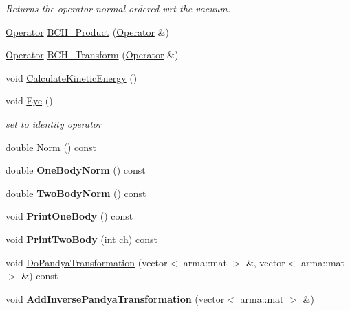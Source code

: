 \begin{DoxyCompactItemize}
\begin{DoxyCompactList}\small\item\em Returns the operator normal-\/ordered wrt the vacuum. \end{DoxyCompactList}\item 
\hyperlink{classOperator}{Operator} \hyperlink{classOperator_a6a91cd02db723ee28b7532e6af029033}{B\-C\-H\-\_\-\-Product} (\hyperlink{classOperator}{Operator} \&)
\item 
\hyperlink{classOperator}{Operator} \hyperlink{classOperator_adc5537604f6b71121163370aca79dfef}{B\-C\-H\-\_\-\-Transform} (\hyperlink{classOperator}{Operator} \&)
\item 
void \hyperlink{classOperator_a701c64f8be794e89fd28a643b56d534a}{Calculate\-Kinetic\-Energy} ()
\item 
\hypertarget{classOperator_a03a378f0da2fe71d8160bd3262891457}{void \hyperlink{classOperator_a03a378f0da2fe71d8160bd3262891457}{Eye} ()}\label{classOperator_a03a378f0da2fe71d8160bd3262891457}

\begin{DoxyCompactList}\small\item\em set to identity operator \end{DoxyCompactList}\item 
double \hyperlink{classOperator_acb9d7959232a636191b91f6bf5b7b0c8}{Norm} () const 
\item 
\hypertarget{classOperator_a72dc7aea85c7775097d235de6f17f330}{double {\bfseries One\-Body\-Norm} () const }\label{classOperator_a72dc7aea85c7775097d235de6f17f330}

\item 
\hypertarget{classOperator_af1c40bdef64ec9abd5d95e8328565a67}{double {\bfseries Two\-Body\-Norm} () const }\label{classOperator_af1c40bdef64ec9abd5d95e8328565a67}

\item 
\hypertarget{classOperator_a5ec5a8110337108ac31d3af7337e454b}{void {\bfseries Print\-One\-Body} () const }\label{classOperator_a5ec5a8110337108ac31d3af7337e454b}

\item 
\hypertarget{classOperator_a905e42cefafaca0eb155cf41b3cd37b8}{void {\bfseries Print\-Two\-Body} (int ch) const }\label{classOperator_a905e42cefafaca0eb155cf41b3cd37b8}

\item 
void \hyperlink{classOperator_afb10f04b274a9ed8a599910a2a5fc0e3}{Do\-Pandya\-Transformation} (vector$<$ arma\-::mat $>$ \&, vector$<$ arma\-::mat $>$ \&) const 
\item 
\hypertarget{classOperator_a52dbcde640637889ab6a1dd90e1ceb62}{void {\bfseries Add\-Inverse\-Pandya\-Transformation} (vector$<$ arma\-::mat $>$ \&)}\label{classOperator_a52dbcde640637889ab6a1dd90e1ceb62}


\end{DoxyCompactItemize}
